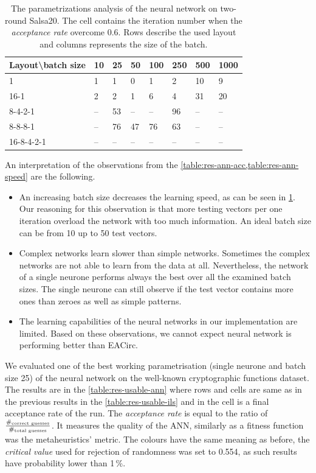 \documentclass[
  print, %
  Table,   %
  nolof,     %
  nolot,     %
  11pt, %
  oneside  %
]{fithesis3}
\begin{document}
\begin{table}[t]
\centering
\begin{tabular}{l|l l l l l l l}
Layout\textbackslash{}batch size & 10 & 25 & 50 & 100 & 250 & 500 & 1000\\ \hline
1          & 1 & 1 & 0 & 1 & 2 & 10 & 9 \\
16-1       & 2 & 2 & 1 & 6 & 4 & 31 & 20 \\
8-4-2-1    & -- & 53 & -- & -- & 96 & -- & -- \\ 
8-8-8-1    & -- & 76 & 47 & 76 & 63 & -- & -- \\
16-8-4-2-1 & -- & -- & -- & -- & -- & -- & --  

\end{tabular}
\caption{The parametrizations analysis of the neural network on two-round Salsa20. The cell contains the iteration number when the \textit{acceptance rate} overcome 0.6. Rows describe the used layout and columns represents the size of the batch.}
\label{table:res-ann-speed}
\end{table}

An interpretation of the observations from the \cref{table:res-ann-acc,table:res-ann-speed} are the following.

\begin{itemize}
    \item An increasing batch size decreases the learning speed, as can be seen in \cref{table:res-ann-speed}. Our reasoning for this observation is that more testing vectors per one iteration overload the network with too much information. An ideal batch size can be from 10 up to 50 test vectors.
    \item Complex networks learn slower than simple networks. Sometimes the complex networks are not able to learn from the data at all. Nevertheless, the network of a single neurone performs always the best over all the examined batch sizes. The single neurone can still observe if the test vector contains more ones than zeroes as well as simple patterns.
    \item The learning capabilities of the neural networks in our implementation are limited. Based on these observations, we cannot expect neural network is performing better than EACirc.
\end{itemize}

We evaluated one of the best working parametrisation (single neurone and batch size 25) of the neural network on the well-known cryptographic functions dataset. The results are in the \cref{table:res-usable-ann} where rows and cells are same as in the previous results in the \cref{table:res-usable-ils} and in the cell is a final acceptance rate of the run. The \textit{acceptance rate} is equal to the ratio of $\frac{\#_{\textnormal{correct guesses}}}{\#_{\textnormal{total guesses}}}$. It measures the quality of the ANN, similarly as a fitness function was the metaheuristics' metric. The colours have the same meaning as before, the \textit{critical value} used for rejection of randomness was set to 0.554, as such results have probability lower than 1\,\%.
\end{document}
